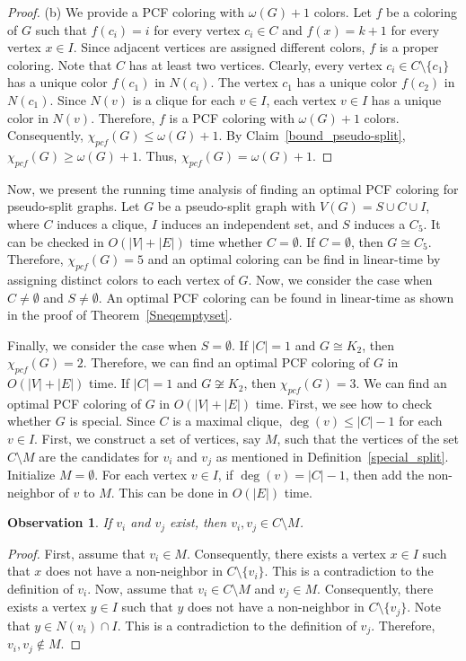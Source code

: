 \documentclass[11pt]{article}
\theoremstyle{plain}
\newtheorem{obs}{Observation}
\begin{document}
\begin{proof}
	(b) We provide a PCF coloring with $\omega(G)+1$ colors. Let $f$ be a coloring of $G$ such that $f(c_i) = i$ for every vertex $c_i\in C$ and $f(x) = k+1$ for every vertex $x\in I$. Since adjacent vertices are assigned different colors, $f$ is a proper coloring. Note that $C$ has at least two vertices.
	Clearly, every vertex $c_i\in C\setminus\{c_1\}$ has a unique color $f(c_1)$ in $N(c_i)$. The vertex $c_1$ has a unique color $f(c_2)$ in $N(c_1)$.
	Since $N(v)$ is a clique for each $v\in I$, each vertex $v\in I$ has a unique color in $N(v)$. Therefore, $f$ is a PCF coloring with $\omega(G)+1$ colors. Consequently, $\chi_{pcf}(G)\leq\omega(G)+1$. By Claim~\ref{bound_pseudo-split}, $\chi_{pcf}(G)\geq\omega(G)+1$. 
	Thus, $\chi_{pcf}(G) = \omega(G)+1$.
\end{proof}

Now, we present the running time analysis of finding an optimal PCF coloring for pseudo-split graphs. 
Let $G$ be a pseudo-split graph with $V(G) = S \cup C \cup I$, where $C$ induces a clique, $I$ induces an independent set, and $S$ induces a $C_5$. It can be checked in $O(|V|+|E|)$ time whether $C=\emptyset$. If $C=\emptyset$, then $G\cong C_5$. Therefore, $\chi_{pcf}(G) = 5$ and an optimal coloring can be find in linear-time by assigning distinct colors to each vertex of $G$. Now, we consider the case when $C\neq\emptyset$ and $S\neq\emptyset$. An optimal PCF coloring can be found in linear-time as shown in the proof of Theorem~\ref{Sneqemptyset}. 

\medskip

Finally, we consider the case when $S=\emptyset$. If $|C|=1$ and $G\cong K_2$, then $\chi_{pcf}(G) = 2$. Therefore, we can find an optimal PCF coloring of $G$ in $O(|V|+|E|)$ time. If $|C|=1$ and $G\not\cong K_2$, then $\chi_{pcf}(G) = 3$. We can find an optimal PCF coloring of $G$ in $O(|V|+|E|)$ time. 
First, we see how to check whether $G$ is special. Since $C$ is a maximal clique, $\deg(v)\leq |C|-1$ for each $v\in I$.
First, we construct a set of vertices, say $M$, such that the vertices of the set $C\setminus M$ are the candidates for $v_i$ and $v_j$ as mentioned in Definition~\ref{special_split}. Initialize $M = \emptyset$.
For each vertex $v\in I$, if $\deg(v) = |C|-1$, then add the non-neighbor of $v$ to $M$. This can be done in $O(|E|)$ time.

\begin{obs}\label{first}
	If $v_i$ and $v_j$ exist, then $v_i, v_j\in C\setminus M$.
\end{obs}
\begin{proof}
	First, assume that $v_i\in M$. Consequently, there exists a vertex $x\in I$ such that $x$ does not have a non-neighbor in $C\setminus\{v_i\}$. %
	This is a contradiction to the definition of $v_i$. Now, assume that $v_i\in C\setminus M$ and $v_j\in M$. Consequently, there exists a vertex $y\in I$ such that $y$ does not have a non-neighbor in $C\setminus\{v_j\}$. %
	Note that $y\in N(v_i)\cap I$. This is a contradiction to the definition of $v_j$. Therefore, $v_i, v_j\notin M$.
\end{proof}
\end{document}
